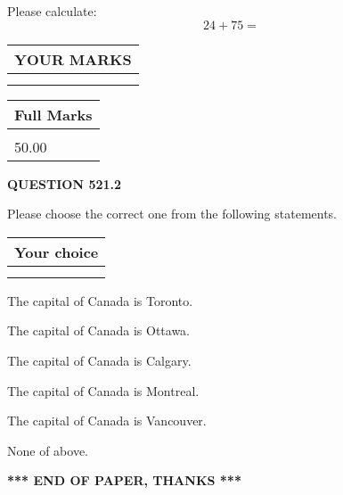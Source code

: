 \documentclass[12pt]{article}
\begin{document}
  
 
Please calculate:
\begin{equation}
24 +  %
75 = \nonumber
\end{equation}
 

 

 
  
\vspace{0.2in}
  
\noindent\begin{tabular}{|l|}
\hline
 YOUR MARKS  \\
\hline
 \\ 
 \\ 
\hline
\end{tabular}
\hspace{0.05in} \begin{tabular}{|l|}
\hline
 Full Marks  \\
\hline
 \\ 
50.00 \\
\hline
\end{tabular}
{\textbf{\Large{QUESTION
521.2 
}}}
  
  
Please choose the correct one from the following statements.
  
  
\noindent\hspace{3.0in} \begin{tabular}{|l|}
\hline
Your choice \\
\hline
 \\ 
 \\ 
\hline
\end{tabular}
  
  
 
 
The capital of Canada is Toronto.
 
 
The capital of Canada is Ottawa.
 
 
The capital of Canada is Calgary.
 
 
The capital of Canada is Montreal.
 
 
The capital of Canada is Vancouver.
 
 
 None of above.
 
 
   
   
 \vspace{0.2in}
 
   
   
   
   
\vspace{1.0in} 
{\textbf{\large{ *** END OF PAPER, THANKS *** }}} 
   
\end{document}
